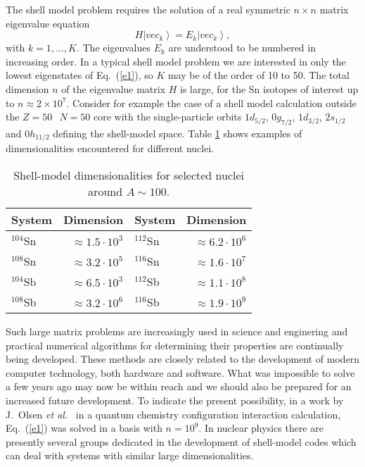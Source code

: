 \documentclass[twoside,12pt]{article}
\newcommand{\be}{\begin{equation}}
\newcommand{\ee}{\end{equation}}
\newcommand{\ket}[1]{\left| #1 \right\rangle}
\begin{document}
The shell model problem requires the solution of a real symmetric
$n \times n$ matrix eigenvalue equation
\be
H\ket{vec_k} = E_k \ket{vec_k},
\label{e1}
\ee
with $k = 1,\ldots, K$. The eigenvalues $E_k$ are understood to be
numbered in increasing order. In a typical shell model problem
we are interested in only the lowest eigenstates of Eq.~(\ref{e1}),
so $K$ may be of the order of 10 to 50.
The total dimension $n$ of the eigenvalue matrix $H$ is large,
for the Sn isotopes of interest up to $n \approx 2 \times 10^{7}$.
Consider for example the case of a shell model calculation
outside the $Z = 50\;\,\; N = 50$ core with the single-particle orbits
$1d_{5/2}$, $0g_{7/2}$, $1d_{3/2}$, $2s_{1/2}$ and $0h_{11/2}$ defining the shell-model
space. Table \ref{tab:dims} shows examples of dimensionalities encountered for 
different nuclei.
\begin{table}
\caption{Shell-model dimensionalities for selected nuclei around $A\sim 100$.\label{tab:dims}}
\begin{center}
\begin{tabular}{|lrlr|} \hline
System & Dimension & System & Dimension\\ \hline
$^{104}$Sn  & $\approx 1.5 \cdot 10^3$&  $^{112}$Sn  & $\approx 6.2 \cdot 10^6$\\
$^{108}$Sn  & $\approx 3.2 \cdot 10^5$&  $^{116}$Sn  & $\approx 1.6 \cdot 10^7$\\ 
$^{104}$Sb  & $\approx 6.5 \cdot 10^3$ &  $^{112}$Sb  & $\approx 1.1 \cdot10^8$ \\
$^{108}$Sb  & $\approx 3.2 \cdot 10^6$ &  $^{116}$Sb  & $\approx 1.9 \cdot 10^9$ \\ \hline
\end{tabular}
\end{center}
\end{table}
Such large matrix problems are increasingly used in science and
enginering and practical numerical algorithms for determining their
properties are continually being developed.
These methods are closely related to the development of modern
computer technology, both  hardware and software.
What was impossible to solve a few years ago may now be within
reach and we should also be prepared for an increased  future
development. To indicate the present possibility,
in a work by J.~Olsen {\sl et al.}~\cite{ols90} in a quantum
chemistry configuration interaction calculation, Eq.~(\ref{e1})
was solved in a basis with $n = 10^{9}$. In nuclear physics there are presently
several groups dedicated in the development of 
shell-model codes which can deal with systems with similar large dimensionalities.
\end{document}
